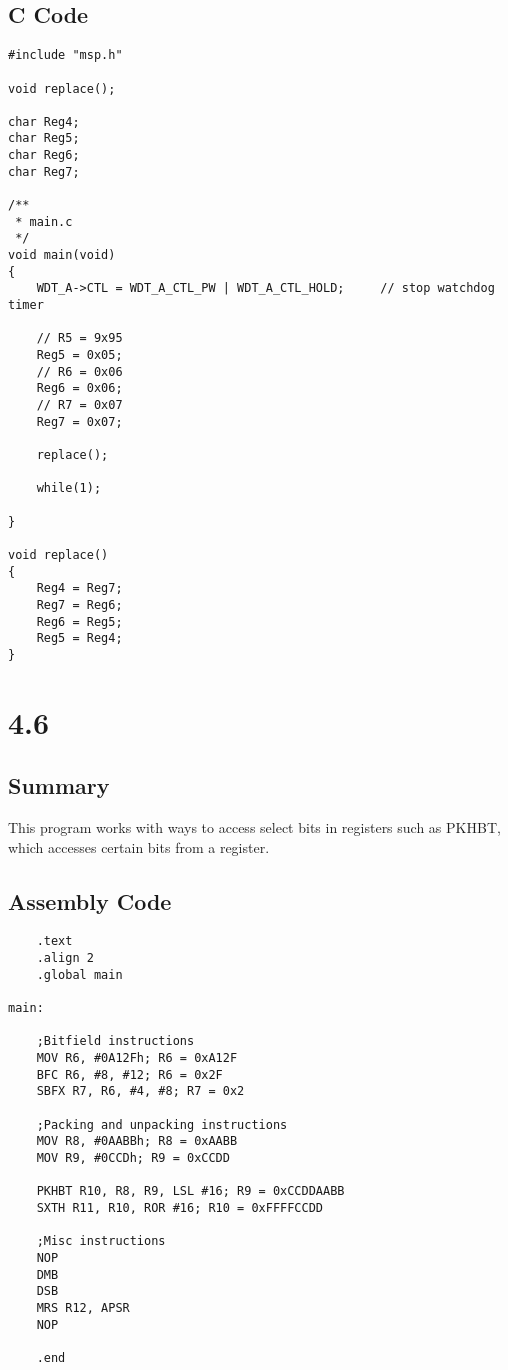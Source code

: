 \documentclass[11pt]{article}
\begin{document}
\subsection{C Code}
\begin{lstlisting}
#include "msp.h"

void replace();

char Reg4;
char Reg5;
char Reg6;
char Reg7;

/**
 * main.c
 */
void main(void)
{
	WDT_A->CTL = WDT_A_CTL_PW | WDT_A_CTL_HOLD;		// stop watchdog timer

	// R5 = 9x95
	Reg5 = 0x05;
	// R6 = 0x06
	Reg6 = 0x06;
	// R7 = 0x07
	Reg7 = 0x07;

	replace();

	while(1);

}

void replace()
{
    Reg4 = Reg7;
    Reg7 = Reg6;
    Reg6 = Reg5;
    Reg5 = Reg4;
}
\end{lstlisting}

\section{4.6}
\subsection{Summary}
This program works with ways to access select bits in registers such as PKHBT, which accesses certain bits from a register.
\subsection{Assembly Code}
\begin{lstlisting}
	.text
	.align 2
	.global main

main:

	;Bitfield instructions
	MOV R6, #0A12Fh; R6 = 0xA12F
	BFC R6, #8, #12; R6 = 0x2F
	SBFX R7, R6, #4, #8; R7 = 0x2

	;Packing and unpacking instructions
	MOV R8, #0AABBh; R8 = 0xAABB
	MOV R9, #0CCDh; R9 = 0xCCDD

	PKHBT R10, R8, R9, LSL #16; R9 = 0xCCDDAABB
	SXTH R11, R10, ROR #16; R10 = 0xFFFFCCDD

	;Misc instructions
	NOP
	DMB
	DSB
	MRS R12, APSR
	NOP

	.end
\end{lstlisting}
\end{document}
